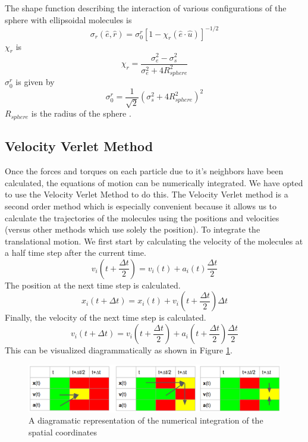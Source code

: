\documentclass[preprint, aps]{revtex4-1}
\begin{document}
The shape function describing the interaction of various configurations of the
sphere with ellipsoidal molecules is
	\begin{equation}
		\sigma_r(\hat{e}, \hat{r}) =
		\sigma_0^r\left[1-\chi_r(\hat{e} \cdot \hat{u})\right]^{-1/2}
	\end{equation}
$\chi_r$ is
	\begin{equation}
		\chi_r = 
		\frac{
			\sigma_e^2 - \sigma_s^2
		}
		{
			\sigma_e^2 + 4R_{sphere}^2
		}
	\end{equation}
$\sigma_0^r$ is given by
	\begin{equation}
		\sigma_0^r 
		= \frac{1}{\sqrt{2}}\left( \sigma_s^2 + 4R_{sphere}^2 \right)^2
	\end{equation}
	$R_{sphere}$ is the radius of the sphere \cite{lubensky98}. 

\subsection*{Velocity Verlet Method}
Once the forces and torques on each particle due to it's neighbors have been
calculated, the equations of motion can be numerically integrated. We have opted
to use the Velocity Verlet Method to do this. The Velocity Verlet method is a
second order method which is especially convenient because it allows us to
calculate the trajectories of the molecules using the positions and velocities
(versus other methods which use solely the position). To integrate the
translational motion. We first start by calculating the velocity of the
molecules at a half time step after the current time. 
	\begin{equation} \label{vv-v1}
		v_i(t+\frac{\Delta t}{2}) 
		= v_i(t) + a_i(t)\frac{\Delta t}{2}
	\end{equation}
The position at the next time step is calculated.
	\begin{equation} \label{vv-x}
		x_i(t+\Delta t) 
		= x_i(t) + v_i(t+\frac{\Delta t}{2})\Delta t
	\end{equation}
Finally, the velocity of the next time step is calculated.
	\begin{equation} \label{vv-v2}
		v_i(t+\Delta t) 
		= v_i(t + \frac{\Delta t}{2}) 
		+ a_i(t + \frac{\Delta t}{2})\frac{\Delta t}{2}
	\end{equation}
This can be visualized diagrammatically as shown in Figure \ref{fig:vv}.
	\begin{figure}[H]
		\includegraphics[width=\textwidth]{vv.png}
		\caption{A diagramatic representation of the numerical integration of
			the spatial coordinates}
		\label{fig:vv}
	\end{figure}
\end{document}
